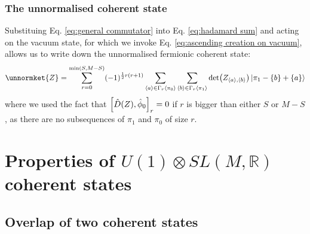 \documentclass[12pt]{article}
\newcommand{\seq}[1]{\langle #1\rangle}
\begin{document}
	\subsubsection{The unnormalised coherent state}
	Substituing Eq. \ref{eq:general commutator} into Eq. \ref{eq:hadamard sum} and acting on the vacuum state, for which we invoke Eq. \ref{eq:ascending creation on vacuum}, allows us to write down the unnormalised fermionic coherent state:
	\begin{equation}\label{eq:unnormalised coherent state}
	\unnormket{Z}=\sum_{r=0}^{\min(S,M-S)}(-1)^{\frac{1}{2}r(r+1)}\sum_{\seq{a}\in\Gamma_r\seq{\pi_0}}\sum_{\seq{b}\in\Gamma_r\seq{\pi_1}}\det(Z_{\seq{a},\seq{b}})\ket{\pi_1-\{b\}+\{a\}}
	\end{equation}
	where we used the fact that $\comm{\hat{D}(Z)}{\hat{\phi}_0}_r=0$ if $r$ is bigger than either $S$ or $M-S$, as there are no subsequences of $\pi_1$ and $\pi_0$ of size $r$.
	
	\section{Properties of $U(1)\otimes SL(M,\mathbb{R})$ coherent states}
	
	\subsection{Overlap of two coherent states}
	
\end{document}
